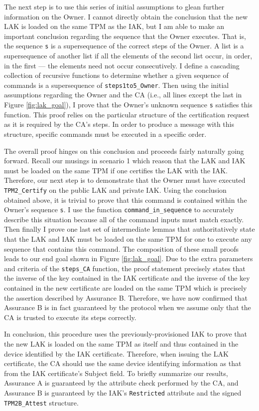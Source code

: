 \documentclass[runningheads]{llncs}
\begin{document}
The next step is to use this series of initial assumptions to glean further information on the Owner. I cannot directly obtain the conclusion that the new LAK is  loaded on the same TPM as the IAK, but I am able to make an important conclusion regarding the sequence that the Owner executes. That is, the sequence \verb|s| is a supersequence of the correct steps of the Owner. A list is a supersequence of another list if all the elements of the second list occur, in order, in the first --- the elements need not occur consecutively. I define a cascading collection of recursive functions to determine whether a given sequence of commands is a supersequence of \verb|steps1to5_Owner|. 
Then using the initial assumptions regarding the Owner and the CA (i.e., all lines except the last in Figure \ref{fig:lak_goal}), I prove that the Owner's unknown sequence \verb|s| satisfies this function. This proof relies on the particular structure of the certification request as it is required by the CA's steps. In order to produce a message with this structure, specific commands must be executed in a specific order.

The overall proof hinges on this conclusion and proceeds fairly naturally going forward. Recall our musings in scenario 1 which reason that the LAK and IAK must be loaded on the same TPM if one certifies the LAK with the IAK. Therefore, our next step is to demonstrate that the Owner must have executed \verb|TPM2_Certify| on the public LAK and private IAK. 
Using the conclusion obtained above, it is trivial to prove that this command is contained within the Owner's sequence \verb|s|.
I use the function \verb|command_in_sequence| to accurately describe this situation because all of the command inputs must match exactly. 
Then finally I prove one last set of intermediate lemmas that authoritatively state that the LAK and IAK must be loaded on the same TPM for one to execute any sequence that contains this command.
The composition of these small proofs leads to our end goal shown in Figure \ref{fig:lak_goal}. Due to the extra parameters and criteria of the \verb|steps_CA| function, the proof statement precisely states that the inverse of the key contained in the IAK certificate and the inverse of the key contained in the new certificate are loaded on the same TPM which is precisely the assertion described by Assurance B. 
Therefore, we have now confirmed that Assurance B is in fact guaranteed by the protocol when we assume only that the CA is trusted to execute its steps correctly. 


In conclusion, this procedure uses the previously-provisioned IAK to prove that the new LAK is loaded on the same TPM as itself and thus contained in the device identified by the IAK certificate. Therefore, when issuing the LAK certificate, the CA should use the same device identifying information as that from the IAK certificate's Subject field. To briefly summarize our results, Assurance A is guaranteed by the attribute check performed by the CA, and Assurance B is guaranteed by the IAK's \verb|Restricted| attribute and the signed \verb|TPM2B_Attest| structure.
\end{document}
